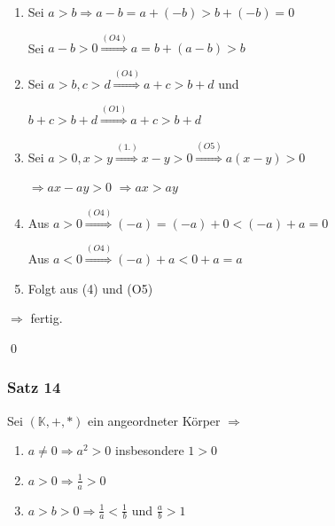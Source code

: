 \documentclass[fleqn]{scrartcl}
\renewenvironment{proof}{{\bfseries Beweis }}{\qed}
\begin{document}
\pagebreak

\begin{proof}

\begin{enumerate}
  \item Sei $a>b \Longrightarrow a-b=a+(-b)>b+(-b)=0$
  
    Sei $a-b>0 \stackrel{(O4)}{\Longrightarrow} a= b+(a-b)>b$
    
  \item Sei $a>b,c>d \stackrel{(O4)}{\Longrightarrow} a+c>b+d$ und
  
    $b+c>b+d \stackrel{(O1)}{\Longrightarrow} a+c>b+d$
    
  \item Sei $a>0,x>y \stackrel{(1.)}{\Longrightarrow} x-y>0 \stackrel{(O5)}{\Longrightarrow} a(x-y)>0$
  
    $\Longrightarrow ax-ay >0$
    $\Longrightarrow ax >ay$
  \item Aus $a>0 \stackrel{(O4)}{\Longrightarrow} (-a)=(-a)+0<(-a)+a=0$
  
    Aus $a<0 \stackrel{(O4)}{\Longrightarrow} (-a)+a<0+a=a$
    
  \item Folgt aus (4) und (O5)
\end{enumerate}

$\Longrightarrow$ fertig.

\end{proof}

\subsubsection{Satz 14}

Sei $(\mathbb{K},+,*)$ ein angeordneter Körper $\Longrightarrow$

\begin{enumerate}
  \item $a \neq 0 \Longrightarrow a^2>0$ insbesondere $1>0$
  
  \item $a > 0 \Longrightarrow \frac{1}{a}>0$
  
  \item $a > b > 0 \Longrightarrow \frac{1}{a}<\frac{1}{b}$ und $\frac{a}{b}>1$
\end{enumerate}
\end{document}
